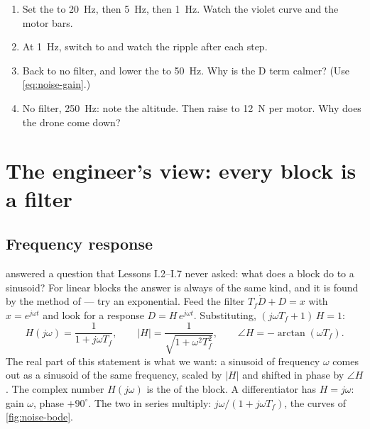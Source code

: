 \begin{trythis}
\begin{enumerate}
  \item Set the  to \SI{20}{Hz}, then \SI{5}{Hz}, then \SI{1}{Hz}. Watch the violet curve and the motor bars.
  \item At \SI{1}{Hz}, switch  to  and watch the ripple after each step.
  \item Back to no filter, and lower the  to \SI{50}{Hz}. Why is the D term calmer? (Use \cref{eq:noise-gain}.)
  \item No filter, \SI{250}{Hz}: note the altitude. Then raise  to \SI{12}{N} per motor. Why does the drone come down?
\end{enumerate}
\end{trythis}

\section{The engineer's view: every block is a filter}

\subsection{Frequency response}
 answered a question that Lessons I.2–I.7 never asked: what does a block do to a sinusoid? For linear blocks the answer is always of the same kind, and it is found by the method of  — try an exponential. Feed the filter $T_f\dot D + D = x$ with $x = e^{j\omega t}$ and look for a response $D = H\,e^{j\omega t}$. Substituting, $(j\omega T_f + 1)\,H = 1$:
\begin{equation}\label{eq:noise-H}
  H(j\omega) = \frac{1}{1 + j\omega T_f}, \qquad |H| = \frac{1}{\sqrt{1 + \omega^2T_f^2}}, \qquad \angle H = -\arctan(\omega T_f) .
\end{equation}
The real part of this statement is what we want: a sinusoid of frequency $\omega$ comes out as a sinusoid of the same frequency, scaled by $|H|$ and shifted in phase by $\angle H$. The complex number $H(j\omega)$ is the  of the block. A differentiator has $H = j\omega$: gain $\omega$, phase $+90^\circ$. The two in series multiply: $j\omega/(1 + j\omega T_f)$, the curves of \cref{fig:noise-bode}.

